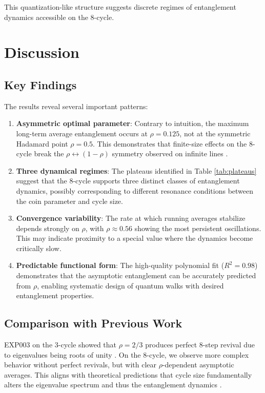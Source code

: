 \documentclass[11pt,a4paper]{article}
\begin{document}
This quantization-like structure suggests discrete regimes of entanglement dynamics accessible on the 8-cycle.

\section{Discussion}

\subsection{Key Findings}

The results reveal several important patterns:

\begin{enumerate}
    \item \textbf{Asymmetric optimal parameter}: Contrary to intuition, the maximum long-term average entanglement occurs at $\rho = 0.125$, not at the symmetric Hadamard point $\rho = 0.5$. This demonstrates that finite-size effects on the 8-cycle break the $\rho \leftrightarrow (1-\rho)$ symmetry observed on infinite lines \citep{muhammad2024}.

    \item \textbf{Three dynamical regimes}: The plateaus identified in Table \ref{tab:plateaus} suggest that the 8-cycle supports three distinct classes of entanglement dynamics, possibly corresponding to different resonance conditions between the coin parameter and cycle size.

    \item \textbf{Convergence variability}: The rate at which running averages stabilize depends strongly on $\rho$, with $\rho \approx 0.56$ showing the most persistent oscillations. This may indicate proximity to a special value where the dynamics become critically slow.

    \item \textbf{Predictable functional form}: The high-quality polynomial fit ($R^2 = 0.98$) demonstrates that the asymptotic entanglement can be accurately predicted from $\rho$, enabling systematic design of quantum walks with desired entanglement properties.
\end{enumerate}

\subsection{Comparison with Previous Work}

EXP003 on the 3-cycle showed that $\rho = 2/3$ produces perfect 8-step revival due to eigenvalues being roots of unity \citep{romanielli2015}. On the 8-cycle, we observe more complex behavior without perfect revivals, but with clear $\rho$-dependent asymptotic averages. This aligns with theoretical predictions that cycle size fundamentally alters the eigenvalue spectrum and thus the entanglement dynamics \citep{bose2024}.
\end{document}
